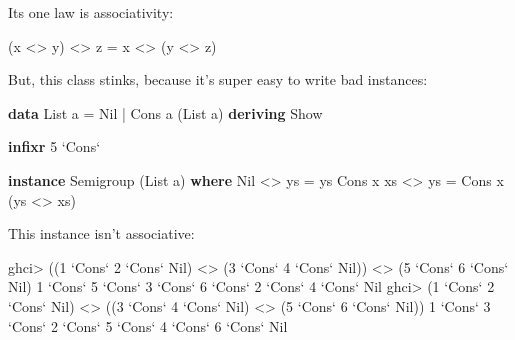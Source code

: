 \documentclass[]{article}
\newenvironment{Shaded}{}{}
\newcommand{\KeywordTok}[1]{\textcolor[rgb]{0.00,0.44,0.13}{\textbf{{#1}}}}
\newcommand{\DataTypeTok}[1]{\textcolor[rgb]{0.56,0.13,0.00}{{#1}}}
\newcommand{\DecValTok}[1]{\textcolor[rgb]{0.25,0.63,0.44}{{#1}}}
\newcommand{\OtherTok}[1]{\textcolor[rgb]{0.00,0.44,0.13}{{#1}}}
\newcommand{\FunctionTok}[1]{\textcolor[rgb]{0.02,0.16,0.49}{{#1}}}
\newcommand{\NormalTok}[1]{{#1}}
\begin{document}
Its one law is associativity:

\begin{Shaded}
\begin{Highlighting}[]
\NormalTok{(x }\FunctionTok{<>} \NormalTok{y) }\FunctionTok{<>} \NormalTok{z }\FunctionTok{=} \NormalTok{x }\FunctionTok{<>} \NormalTok{(y }\FunctionTok{<>} \NormalTok{z)}
\end{Highlighting}
\end{Shaded}

But, this class stinks, because it's super easy to write bad instances:

\begin{Shaded}
\begin{Highlighting}[]
\KeywordTok{data} \DataTypeTok{List} \NormalTok{a }\FunctionTok{=} \DataTypeTok{Nil} \FunctionTok{|} \DataTypeTok{Cons} \NormalTok{a (}\DataTypeTok{List} \NormalTok{a)}
    \KeywordTok{deriving} \DataTypeTok{Show}

\KeywordTok{infixr} \DecValTok{5} \OtherTok{`Cons`}

\KeywordTok{instance} \DataTypeTok{Semigroup} \NormalTok{(}\DataTypeTok{List} \NormalTok{a) }\KeywordTok{where}
    \DataTypeTok{Nil}       \FunctionTok{<>} \NormalTok{ys }\FunctionTok{=} \NormalTok{ys}
    \DataTypeTok{Cons} \NormalTok{x xs }\FunctionTok{<>} \NormalTok{ys }\FunctionTok{=} \DataTypeTok{Cons} \NormalTok{x (ys }\FunctionTok{<>} \NormalTok{xs)}
\end{Highlighting}
\end{Shaded}

This instance isn't associative:

\begin{Shaded}
\begin{Highlighting}[]
\NormalTok{ghci}\FunctionTok{>} \NormalTok{((}\DecValTok{1} \OtherTok{`Cons`} \DecValTok{2} \OtherTok{`Cons`} \DataTypeTok{Nil}\NormalTok{) }\FunctionTok{<>} \NormalTok{(}\DecValTok{3} \OtherTok{`Cons`} \DecValTok{4} \OtherTok{`Cons`} \DataTypeTok{Nil}\NormalTok{)) }\FunctionTok{<>} \NormalTok{(}\DecValTok{5} \OtherTok{`Cons`} \DecValTok{6} \OtherTok{`Cons`} \DataTypeTok{Nil}\NormalTok{)}
\DecValTok{1} \OtherTok{`Cons`} \DecValTok{5} \OtherTok{`Cons`} \DecValTok{3} \OtherTok{`Cons`} \DecValTok{6} \OtherTok{`Cons`} \DecValTok{2} \OtherTok{`Cons`} \DecValTok{4} \OtherTok{`Cons`} \DataTypeTok{Nil}
\NormalTok{ghci}\FunctionTok{>} \NormalTok{(}\DecValTok{1} \OtherTok{`Cons`} \DecValTok{2} \OtherTok{`Cons`} \DataTypeTok{Nil}\NormalTok{) }\FunctionTok{<>} \NormalTok{((}\DecValTok{3} \OtherTok{`Cons`} \DecValTok{4} \OtherTok{`Cons`} \DataTypeTok{Nil}\NormalTok{) }\FunctionTok{<>} \NormalTok{(}\DecValTok{5} \OtherTok{`Cons`} \DecValTok{6} \OtherTok{`Cons`} \DataTypeTok{Nil}\NormalTok{))}
\DecValTok{1} \OtherTok{`Cons`} \DecValTok{3} \OtherTok{`Cons`} \DecValTok{2} \OtherTok{`Cons`} \DecValTok{5} \OtherTok{`Cons`} \DecValTok{4} \OtherTok{`Cons`} \DecValTok{6} \OtherTok{`Cons`} \DataTypeTok{Nil}
\end{Highlighting}
\end{Shaded}
\end{document}
